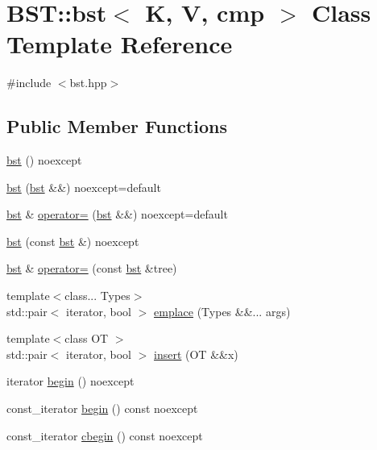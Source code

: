 \hypertarget{classBST_1_1bst}{}\section{B\+ST\+:\+:bst$<$ K, V, cmp $>$ Class Template Reference}
\label{classBST_1_1bst}


{\ttfamily \#include $<$bst.\+hpp$>$}

\subsection*{Public Member Functions}
\begin{DoxyCompactItemize}
\item 
\hyperlink{classBST_1_1bst_a4e9627986dc492f5b5ca99d81073cbae}{bst} () noexcept
\item 
\hyperlink{classBST_1_1bst_a2e920ad809f46ab051c9f49d5108bc70}{bst} (\hyperlink{classBST_1_1bst}{bst} \&\&) noexcept=default
\item 
\hyperlink{classBST_1_1bst}{bst} \& \hyperlink{classBST_1_1bst_abab0876508a7ed84d1256bb0e0139af6}{operator=} (\hyperlink{classBST_1_1bst}{bst} \&\&) noexcept=default
\item 
\hyperlink{classBST_1_1bst_a811be23769155f907fbb904af5b87a29}{bst} (const \hyperlink{classBST_1_1bst}{bst} \&) noexcept
\item 
\hyperlink{classBST_1_1bst}{bst} \& \hyperlink{classBST_1_1bst_aa96092243a0acee13f8823006ca6fd34}{operator=} (const \hyperlink{classBST_1_1bst}{bst} \&tree)
\item 
{\footnotesize template$<$class... Types$>$ }\\std\+::pair$<$ iterator, bool $>$ \hyperlink{classBST_1_1bst_a39b5fa926b67f6f4089e32aeb63a74b9}{emplace} (Types \&\&... args)
\item 
{\footnotesize template$<$class OT $>$ }\\std\+::pair$<$ iterator, bool $>$ \hyperlink{classBST_1_1bst_a415605474ad54b651f34d73c448fdba3}{insert} (OT \&\&x)
\item 
iterator \hyperlink{classBST_1_1bst_a998e86071c043c562ac906197cbf015e}{begin} () noexcept
\item 
const\+\_\+iterator \hyperlink{classBST_1_1bst_a09b9837132cc0a911be4409bab8ab56f}{begin} () const noexcept
\item 
const\+\_\+iterator \hyperlink{classBST_1_1bst_aeb386c648e83761a52fe4ff1ac493463}{cbegin} () const noexcept
\item 

\end{DoxyCompactItemize}
